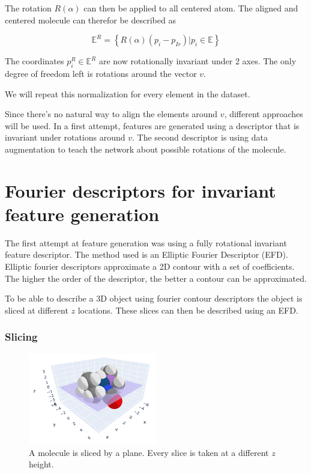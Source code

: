 The rotation $R(\alpha)$ can then be applied to all centered atom.
The aligned and centered molecule can therefor be described as

$$ 
\mathbb{E}^R = \left\{ R(\alpha) (p_i - p_{Ir}) |  p_i \in \mathbb{E} \right\}
$$

The coordinates $p^R_i \in \mathbb{E}^R$ are now rotationally invariant under 2 axes. 
The only degree of freedom left is rotations around the vector $v$. 

We will repeat this normalization for every element in the dataset.

Since there's no natural way to align the elements around $v$, different approaches will be used.
In a first attempt, features are generated using a descriptor that is invariant under rotations around $v$.
The second descriptor is using data augmentation to teach the network about possible rotations of the molecule.

\section{Fourier descriptors for invariant feature generation}

The first attempt at feature generation was using a fully rotational invariant feature descriptor.
The method used is an Elliptic Fourier Descriptor (EFD).
Elliptic fourier descriptors approximate a 2D contour with a set of coefficients.
The higher the order of the descriptor, the better a contour can be approximated.

To be able to describe a 3D object using fourier contour descriptors the object is sliced at different $z$ locations.
These slices can then be described using an EFD.

\subsubsection{Slicing}

\begin{figure} [h]
  \centering
  \includegraphics[width=0.5\textwidth]{figures/fourier/slice3d.png} %
  \caption{A molecule is sliced by a plane. Every slice is taken at a different $z$ height.}
  \label{fig:slice3d}
\end{figure}

